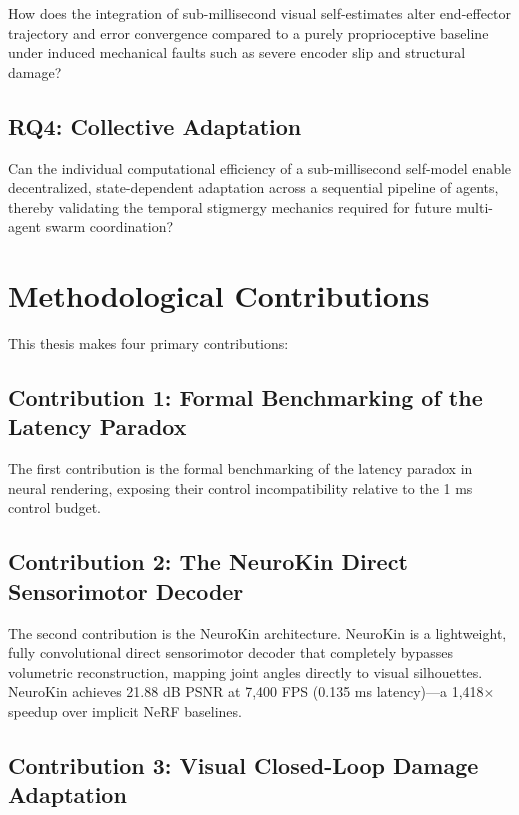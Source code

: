 \documentclass[12pt,a4paper,oneside]{report}
\begin{document}
How does the integration of sub-millisecond visual self-estimates alter end-effector trajectory and error convergence compared to a purely proprioceptive baseline under induced mechanical faults such as severe encoder slip and structural damage?

\subsection{RQ4: Collective Adaptation}
\label{subsec:RQ4_intro}

Can the individual computational efficiency of a sub-millisecond self-model enable decentralized, state-dependent adaptation across a sequential pipeline of agents, thereby validating the temporal stigmergy mechanics required for future multi-agent swarm coordination?

\section{Methodological Contributions}
\label{sec:methodological_contributions_intro}

This thesis makes four primary contributions:

\subsection{Contribution 1: Formal Benchmarking of the Latency Paradox}

The first contribution is the formal benchmarking of the latency paradox in neural rendering, exposing their control incompatibility relative to the 1 ms control budget.

\subsection{Contribution 2: The NeuroKin Direct Sensorimotor Decoder}

The second contribution is the NeuroKin architecture. NeuroKin is a lightweight, fully convolutional direct sensorimotor decoder that completely bypasses volumetric reconstruction, mapping joint angles directly to visual silhouettes. NeuroKin achieves 21.88 dB PSNR at 7,400 FPS (0.135 ms latency)---a 1,418$\times$ speedup over implicit NeRF baselines.

\subsection{Contribution 3: Visual Closed-Loop Damage Adaptation}
\end{document}
